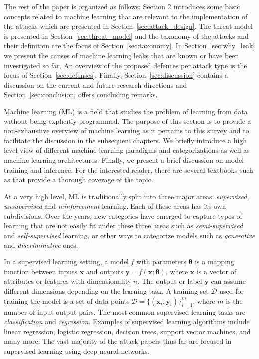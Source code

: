 The rest of the paper is organized as follows: Section 2 introduces some basic concepts related to machine learning that are relevant to the implementation of the attacks which are presented in Section~\ref{sec:attack_design}. The threat model is presented in Section~\ref{sec:threat_model} and the taxonomy of the attacks and their definition are the focus of Section~\ref{sec:taxonomy}. In Section~\ref{sec:why_leak} we present the causes of machine learning leaks that are known or have been investigated so far. An overview of the proposed defences per attack type is the focus of Section~\ref{sec:defenses}. Finally, Section~\ref{sec:discussion} contains a discussion on the current and future research directions and Section~\ref{sec:conclusion} offers concluding remarks.

Machine learning (ML) is a field that studies the problem of learning from data without being explicitly programmed. The purpose of this section is to provide a non-exhaustive overview of machine learning as it pertains to this survey and to facilitate the discussion in the subsequent chapters. We briefly introduce a high level view of different machine learning paradigms and categorizations as well as machine learning architectures. Finally, we present a brief discussion on model training and inference. For the interested reader, there are several textbooks such as  that provide a thorough coverage of the topic.

At a very high level, ML is traditionally split into three major areas: \textit{supervised}, \textit{unsupervised} and \textit{reinforcement} learning. Each of these areas has its own subdivisions. Over the years, new categories have emerged to capture types of learning that are not easily fit under these three areas such as \textit{semi-supervised} and \textit{self-supervised} learning, or other ways to categorize models such as \textit{generative} and \textit{discriminative} ones.

In a supervised learning setting, a model $f$ with parameters $\mathbf{\theta}$ is a mapping function between inputs $\mathbf{x}$ and outputs $\mathbf{y}=f(\mathbf{x};\mathbf{\theta})$, where $\mathbf{x}$ is a vector of attributes or features with dimensionality $n$. The output or label $\mathbf{y}$ can assume different dimensions depending on the learning task. A training set $\mathcal{D}$ used for training the model is a set of data points $\mathcal{D} = \{(\mathbf{x}_{i}, \mathbf{y}_{i})\}_{i=1}^{m}$, where $m$ is the number of input-output pairs. The most common supervised learning tasks are \textit{classification} and \textit{regression}. Examples of supervised learning algorithms include linear regression, logistic regression, decision trees, support vector machines, and many more. The vast majority of the attack papers thus far are focused in supervised learning using deep neural networks.

